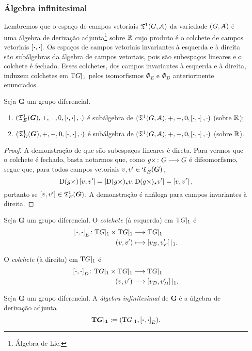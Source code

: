 \subsubsection{Álgebra infinitesimal}

Lembremos que o espaço de campos vetoriais $\mathfrak{T}^1(G,\mathcal{A})$ da variedade $(G,\mathcal{A})$ é uma álgebra de derivação adjunta\footnote{Álgebra de Lie.} sobre $\mathbb{R}$ cujo produto é o colchete de campos vetoriais $\left[{\bm{\cdot}},{\bm{\cdot}}\right]$. Os espaços de campos vetoriais invariantes à esquerda e à direita são subálgebras da álgebra de campos vetoriais, pois são subespaços lineares e o colchete é fechado. Esses colchetes, dos campos invariantes à esquerda e à direita, induzem colchetes em $\mathrm{T} G|_1$ pelos isomorfismos $\Phi_E$ e $\Phi_D$ anteriormente enunciados.

\begin{proposition}
Seja $\bm G$ um grupo diferencial.
	\begin{enumerate}
	\item $(\mathfrak{T}^1_E(\bm G),+,-,0,\left[{\bm{\cdot}},{\bm{\cdot}}\right],\cdot)$ é subálgebra de $(\mathfrak{T}^1(G,\mathcal{A}),+,-,0,\left[{\bm{\cdot}},{\bm{\cdot}}\right],\cdot)$ (sobre $\mathbb{R}$);
	\item $(\mathfrak{T}^1_D(\bm G),+,-,0,\left[{\bm{\cdot}},{\bm{\cdot}}\right],\cdot)$ é subálgebra de $(\mathfrak{T}^1(G,\mathcal{A}),+,-,0,\left[{\bm{\cdot}},{\bm{\cdot}}\right],\cdot)$ (sobre $\mathbb{R}$).
	\end{enumerate}
\end{proposition}
\begin{proof}
A demonstração de que são subespaços lineares é direta. Para vermos que o colchete é fechado, basta notarmos que, como ${g\times}\colon {G} \longrightarrow {G}$ é difeomorfismo, segue que, para todos campos vetoriais $v,v' \in \mathfrak{T}^1_E(\bm G)$,
	\begin{equation*}
	\mathrm{D} (g\times)\left[{v},{v'}\right] = \left[{\mathrm{D}(g \times)_\star v},{\mathrm{D}(g \times)_\star v'}\right] = \left[{v},{v'}\right],
	\end{equation*}
portanto se $\left[{v},{v'}\right] \in \mathfrak{T}^1_E(\bm G)$. A demonstração é análoga para campos invariantes à direita.
\end{proof}

\begin{definition}
Seja $\bm G$ um grupo diferencial. O \emph{colchete} (à esquerda) em $\mathrm{T} G|_1$ é
	\begin{align*}
	{\left[{\bm{\cdot}},{\bm{\cdot}}\right]_E}\colon {\mathrm{T}G|_1 \times \mathrm{T}G|_1} &\longrightarrow {\mathrm{T}G|_1} \\{(v,v')} &\longmapsto \left[{v_E},{v'_E}\right]|_1.
	\end{align*}

O \emph{colchete} (à direita) em $\mathrm{T} G|_1$ é
	\begin{align*}
	{\left[{\bm{\cdot}},{\bm{\cdot}}\right]_D}\colon {\mathrm{T}G|_1 \times \mathrm{T}G|_1} &\longrightarrow {\mathrm{T}G|_1} \\{(v,v')} &\longmapsto \left[{v_D},{v'_D}\right]|_1.
	\end{align*}
\end{definition}

\begin{definition}
Seja $\bm G$ um grupo diferencial. A \emph{álgebra infinitesimal} de $\bm G$ é a álgebra de derivação adjunta
	\begin{equation*}
	\bm{\mathrm{T} G|_1} := (\mathrm{T} G|_1,\left[{\bm{\cdot}},{\bm{\cdot}}\right]_E).
	\end{equation*}
\end{definition}

